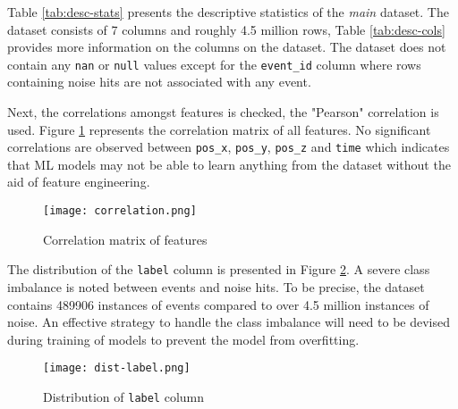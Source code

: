 Table \ref{tab:desc-stats} presents the descriptive statistics of the
\emph{main} dataset. The dataset consists of 7 columns and roughly 4.5 million
rows, Table \ref{tab:desc-cols} provides more information on the columns on the
dataset. The dataset does not contain any \texttt{nan} or \texttt{null} values
except for the \texttt{event\_id} column where rows containing noise hits are
not associated with any event.

Next, the correlations amongst features is checked, the "Pearson" correlation
is used. Figure \ref{fig:corr} represents the correlation matrix of all
features. No significant correlations are observed between \texttt{pos\_x},
\texttt{pos\_y}, \texttt{pos\_z} and \texttt{time} which indicates that ML
models may not be able to learn anything from the dataset without the aid of
feature engineering.

\begin{figure}[h]
  \centering
  \texttt{[image: correlation.png]}
  \caption{Correlation matrix of features}%
  \label{fig:corr}
\end{figure}

The distribution of the \texttt{label} column is presented in Figure
\ref{fig:dist-label}. A severe class imbalance is noted between events and
noise hits. To be precise, the dataset contains 489906 instances of events
compared to over 4.5 million instances of noise. An effective strategy to
handle the class imbalance will need to be devised during training of models
to prevent the model from overfitting.

\begin{figure}[h]
  \centering
  \texttt{[image: dist-label.png]}
  \caption{Distribution of \texttt{label} column}%
  \label{fig:dist-label}
\end{figure}



